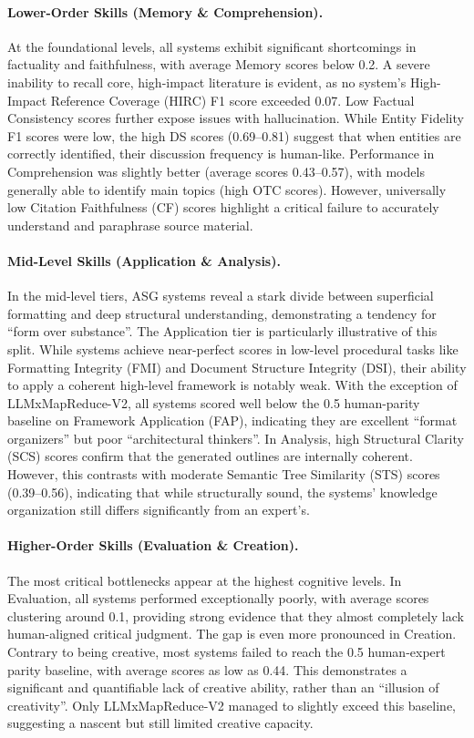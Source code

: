 \documentclass[11pt]{article}
\begin{document}
\paragraph{Lower-Order Skills (Memory \& Comprehension).}
At the foundational levels, all systems exhibit significant shortcomings in factuality and faithfulness, with average Memory scores below 0.2. A severe inability to recall core, high-impact literature is evident, as no system's High-Impact Reference Coverage (HIRC) F1 score exceeded 0.07. Low Factual Consistency scores further expose issues with hallucination. While Entity Fidelity F1 scores were low, the high DS scores (0.69--0.81) suggest that when entities are correctly identified, their discussion frequency is human-like. Performance in Comprehension was slightly better (average scores 0.43--0.57), with models generally able to identify main topics (high OTC scores). However, universally low Citation Faithfulness (CF) scores highlight a critical failure to accurately understand and paraphrase source material.


\paragraph{Mid-Level Skills (Application \& Analysis).}
In the mid-level tiers, ASG systems reveal a stark divide between superficial formatting and deep structural understanding, demonstrating a tendency for  ``form over substance''. The Application tier is particularly illustrative of this split. While systems achieve near-perfect scores in low-level procedural tasks like Formatting Integrity (FMI) and Document Structure Integrity (DSI), their ability to apply a coherent high-level framework is notably weak. With the exception of LLMxMapReduce-V2, all systems scored well below the 0.5 human-parity baseline on Framework Application (FAP), indicating they are excellent ``format organizers'' but poor ``architectural thinkers''. In Analysis, high Structural Clarity (SCS) scores confirm that the generated outlines are internally coherent. However, this contrasts with moderate Semantic Tree Similarity (STS) scores (0.39--0.56), indicating that while structurally sound, the systems' knowledge organization still differs significantly from an expert's.

\paragraph{Higher-Order Skills (Evaluation \& Creation).}
The most critical bottlenecks appear at the highest cognitive levels. In Evaluation, all systems performed exceptionally poorly, with average scores clustering around 0.1, providing strong evidence that they almost completely lack human-aligned critical judgment. The gap is even more pronounced in Creation. Contrary to being creative, most systems failed to reach the 0.5 human-expert parity baseline, with average scores as low as 0.44. This demonstrates a significant and quantifiable lack of creative ability, rather than an ``illusion of creativity''. Only LLMxMapReduce-V2 managed to slightly exceed this baseline, suggesting a nascent but still limited creative capacity.
\end{document}
